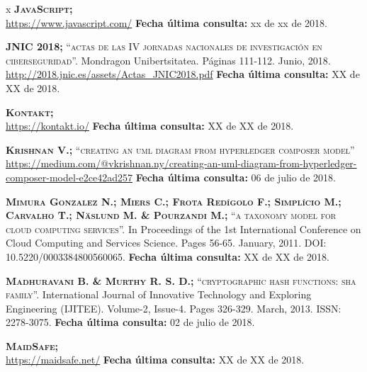 \begin{thebibliography} {x}
	 \textsc{\textbf{JavaScript; }} \\ 
	\url{https://www.javascript.com/}
	\newline \textbf{Fecha última consulta:} xx de xx de 2018.
		
	 \textsc{\textbf{JNIC 2018; }}\textsc{“actas de las IV jornadas nacionales de investigación en ciberseguridad”.} Mondragon Unibertsitatea. Páginas 111-112. Junio, 2018. \\
	\url{http://2018.jnic.es/assets/Actas_JNIC2018.pdf}
	\newline \textbf{Fecha última consulta:} XX de XX de 2018.
	
	 \textsc{\textbf{Kontakt; }} \\
	\url{https://kontakt.io/}
	\newline \textbf{Fecha última consulta:} XX de XX de 2018.
	
	 \textsc{\textbf{Krishnan V.; }}\textsc{“creating an uml diagram from hyperledger composer model”} \\
	\url{https://medium.com/@vkrishnan.ny/creating-an-uml-diagram-from-hyperledger-composer-model-e2ce42ad257}
	\newline \textbf{Fecha última consulta:} 06 de julio de 2018.
		
	 \textsc{\textbf{Mimura Gonzalez N.; Miers C.; Frota Redígolo F.; Simplício M.; Carvalho T.; Näslund M. \& Pourzandi M.; }}\textsc{“a taxonomy model for cloud computing services”.} In Proceedings of the 1st International Conference on Cloud Computing and Services Science. Pages 56-65. January, 2011. DOI: 10.5220/0003384800560065.
	\newline \textbf{Fecha última consulta:} XX de XX de 2018.
		
	 \textsc{\textbf{Madhuravani B. \& Murthy R. S. D.; }}\textsc{“cryptographic hash functions: sha family”.} International Journal of Innovative Technology and Exploring Engineering (IJITEE). Volume-2, Issue-4. Pages 326-329. March, 2013. ISSN: 2278-3075.
	\newline \textbf{Fecha última consulta:} 02 de julio de 2018.
	
	 \textsc{\textbf{MaidSafe; }} \\
	\url{https://maidsafe.net/}
	\newline \textbf{Fecha última consulta:} XX de XX de 2018.
	

\end{thebibliography}
